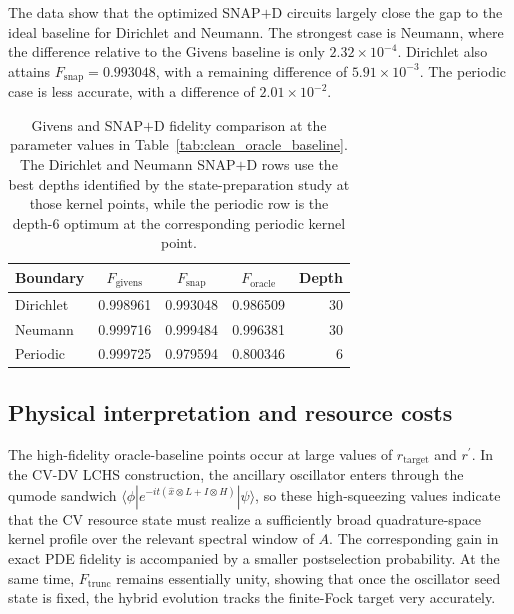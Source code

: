 The data show that the optimized SNAP$+$D circuits largely close the gap to the ideal baseline for Dirichlet and Neumann. The strongest case is Neumann, where the difference relative to the Givens baseline is only $2.32\times 10^{-4}$. Dirichlet also attains $F_{\mathrm{snap}}=0.993048$, with a remaining difference of $5.91\times 10^{-3}$. The periodic case is less accurate, with a difference of $2.01\times 10^{-2}$.

\begin{table}[t]
\centering
\caption{Givens and SNAP$+$D fidelity comparison at the parameter values in Table~\ref{tab:clean_oracle_baseline}. The Dirichlet and Neumann SNAP$+$D rows use the best depths identified by the state-preparation study at those kernel points, while the periodic row is the depth-$6$ optimum at the corresponding periodic kernel point.}
\label{tab:clean_snap_comparison}
\begin{tabular}{lcccr}
\toprule
Boundary & $F_{\mathrm{givens}}$ & $F_{\mathrm{snap}}$ & $F_{\mathrm{oracle}}$ & Depth \\
\midrule
Dirichlet & 0.998961 & 0.993048 & 0.986509 & 30 \\
Neumann & 0.999716 & 0.999484 & 0.996381 & 30 \\
Periodic & 0.999725 & 0.979594 & 0.800346 & 6 \\
\bottomrule
\end{tabular}
\end{table}

\subsection{Physical interpretation and resource costs}

The high-fidelity oracle-baseline points occur at large values of $r_{\mathrm{target}}$ and $r^\prime$. In the CV-DV LCHS construction, the ancillary oscillator enters through the qumode sandwich $\langle \phi | e^{-it(\hat{x}\otimes L + I\otimes H)} | \psi \rangle$, so these high-squeezing values indicate that the CV resource state must realize a sufficiently broad quadrature-space kernel profile over the relevant spectral window of $A$. The corresponding gain in exact PDE fidelity is accompanied by a smaller postselection probability. At the same time, $F_{\mathrm{trunc}}$ remains essentially unity, showing that once the oscillator seed state is fixed, the hybrid evolution tracks the finite-Fock target very accurately.

